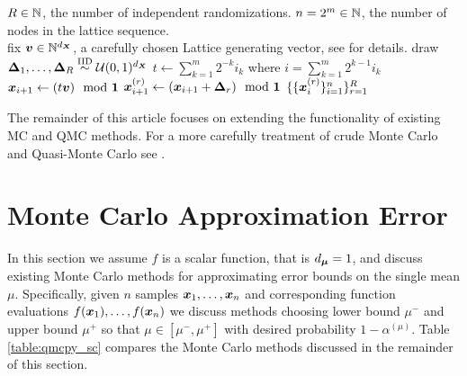 \documentclass{article}[12pt]
\begin{document}
\begin{algorithm}[h!]
    \caption{$\texttt{Gen.Lattice}(R,n)$}
    \label{algo:Gen.Lattice}
    \begin{algorithmic}
    \Require $R \in \mathbb{N}$, the number of independent randomizations.
    \Require $n = 2^m \in \mathbb{N}$, the number of nodes in the lattice sequence.
    \\ \hrulefill
    \State fix $\boldsymbol{v} \in \mathbb{N}^{d_{\boldsymbol{X}}}$, a carefully chosen Lattice generating vector, see \cite{cools2006constructing,hickernell2000extensible} for details. 
    \State draw $\boldsymbol{\Delta}_1,\dots,\boldsymbol{\Delta}_R \overset{\text{IID}}{\sim} \mathcal{U}(0,1)^{d_{\boldsymbol{X}}}$
        \State $t \gets \sum_{k=1}^m 2^{-k}i_k$ where $i = \sum_{k=1}^m 2^{k-1} i_k$ 
        \State $\boldsymbol{x}_{i+1} \gets (t\boldsymbol{v}) \mod \boldsymbol{1}$
            \State $\boldsymbol{x}_{i+1}^{(r)} \gets (\boldsymbol{x}_{i+1}+\boldsymbol{\Delta}_r) \mod \boldsymbol{1}$
        \EndFor
    \EndFor
    \State \Return $\{\{\boldsymbol{x}_i^{(r)}\}_{i=1}^n\}_{r=1}^R$
    \end{algorithmic}
\end{algorithm}
    
The remainder of this article focuses on extending the functionality of existing MC and QMC methods. For a more carefully treatment of crude Monte Carlo and Quasi-Monte Carlo see \cite{mcbook}. 

\section{Monte Carlo Approximation Error}\label{sec:Existing_QMC_Methods}

In this section we assume $f$ is a scalar function, that is $d_{\boldsymbol{\mu}}=1$, and discuss existing Monte Carlo methods for approximating error bounds on the single mean $\mu$. Specifically, given $n$ samples $\boldsymbol{x}_1,\dots,\boldsymbol{x}_n$ and  corresponding function evaluations $f(\boldsymbol{x}_1),\dots,f(\boldsymbol{x}_n)$ we discuss methods choosing lower bound $\mu^-$ and upper bound $\mu^+$ so that $\mu \in [\mu^-,\mu^+]$ with desired probability $1-\alpha^{(\mu)}$. Table \ref{table:qmcpy_sc} compares the Monte Carlo methods discussed in the remainder of this section.
\end{document}
